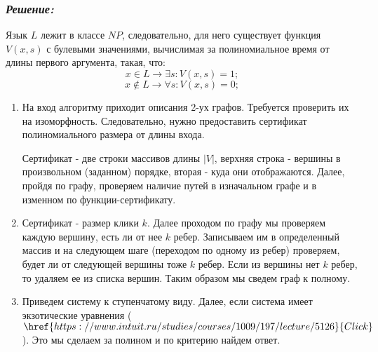 \documentclass[a4paper, 12pt]{article}
\begin{document}
\subsubsection*{\textit{Решение:}}

Язык $L$ лежит в классе $NP$, следовательно, для него существует функция $V(x, s)$ с булевыми значениями, вычислимая за полиномиальное время от длины первого аргумента, такая, что:
	 \[x \in L \to \exists s: V(x, s) = 1;\]
	\[x \notin L \to \forall s: V(x, s) = 0;\]

\begin{enumerate}
\item На вход алгоритму приходит описания 2-ух графов. Требуется проверить их на изоморфность. Следовательно, нужно предоставить сертификат полиномиального размера от длины входа.

Сертификат - две строки массивов длины $|V|$, верхняя строка - вершины в произвольном (заданном) порядке, вторая - куда они отображаются. Далее, пройдя по графу, проверяем наличие путей в изначальном графе и в изменном по функции-сертификату.

\item Сертификат - размер клики $k$. Далее проходом по графу мы проверяем каждую вершину, есть ли от нее $k$ ребер. Записываем им в определенный массив и на следующем шаге (переходом по одному из ребер) проверяем, будет ли от следующей вершины тоже $k$ ребер. Если из вершины нет $k$ ребер, то удаляем ее из списка вершин. Таким образом мы сведем граф к полному.

\item Приведем систему к ступенчатому виду. Далее, если система имеет экзотические уравнения ($\href{https://www.intuit.ru/studies/courses/1009/197/lecture/5126}{Click}$). Это мы сделаем за полином и по критерию найдем ответ.
\end{enumerate}
\end{document}
